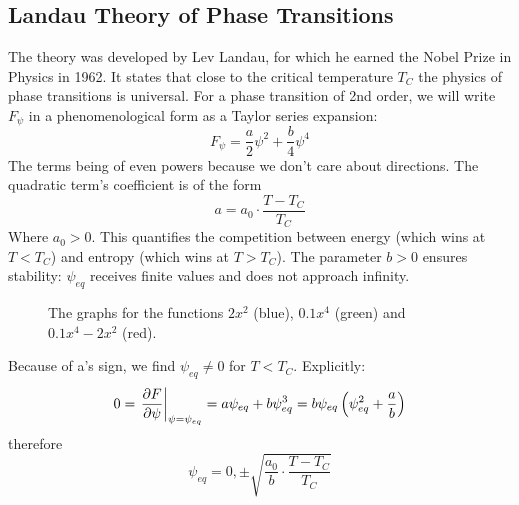 \subsection{Landau Theory of Phase Transitions}
The theory was developed by Lev Landau, for which he earned the Nobel Prize in Physics in 1962. It states that close to the critical temperature \(T_C \) the physics of phase transitions is universal. For a phase transition of 2nd order, we will write \(F_\psi \) in a phenomenological form as a Taylor series expansion:
\begin{equation}
	F_\psi = \frac{a}{2}\psi^2+\frac{b}{4}\psi^4
\end{equation}
The terms being of even powers because we don't care about directions. The quadratic term's coefficient is of the form
\begin{equation}
	a=a_0\cdot\frac{T-T_C}{T_C}
\end{equation}
Where \(a_0>0\). This quantifies the competition between energy (which wins at \(T<T_C\)) and entropy (which wins at \(T>T_C\)). The parameter \(b>0\) ensures stability: \(\psi_{eq}\) receives finite values and does not approach infinity.
\begin{figure}[!htb]
	\centering
	\caption{The graphs for the functions \(2x^2\) (blue), \(0.1x^4\) (green) and \(0.1x^4-2x^2\) (red).}
\end{figure}
Because of a's sign, we find \(\psi_{eq}\neq0\) for \(T<T_C\). Explicitly:
\begin{equation}
	0=\left.\diffp{F}{\psi}\right|_{\psi=\psi_{eq}}=a\psi_{eq}+b\psi_{eq}^3=b\psi_{eq}\left(\psi_{eq}^2+\frac{a}{b}\right)
\end{equation}
therefore
\begin{equation}\label{solution_psi_eq_ch1}
	\psi_{eq} = 0, \pm \sqrt{\frac{a_0}{b}\cdot\frac{T-T_C}{T_C}}
\end{equation}

